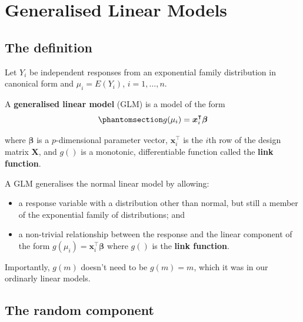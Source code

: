 \documentclass[
  a4paper,
  DIV=11,
  numbers=noendperiod]{scrreprt}
\newcommand{\term}[1]{\textbf{#1}}
\newenvironment{fbxSimple}[3]{\begin{tcolorbox}[enhanced, breakable,%
attach boxed title to top*={xshift=1.4pt},
boxed title style={boxrule=0.0mm, fuzzy shadow={1pt}{-1pt}{0mm}{0.1mm}{gray}, arc=.3em, rounded corners=east, sharp corners=west}, colframe=#1-color2, colbacktitle=#1-color1, colback = white, coltitle=black,  titlerule=0mm, toprule=0pt, bottomrule=.7pt, leftrule=.3em, rightrule=.7pt, outer arc=.3em,  	left=.5em, right=.5em, bottomtitle=1mm, toptitle=1mm,title=\textbf{#2}\hspace{0.5em}{#3}]}
{\end{tcolorbox}}
\begin{document}
\section{Generalised Linear Models}\label{generalised-linear-models}

\subsection{The definition}\label{the-definition}

\label{generalised-linear-models-1}
\begin{fbxSimple}{Definition}{Definition 4: }{Generalised Linear Models}
\label{generalised-linear-models-1}
Let \(Y_i\) be independent responses from an exponential family
distribution in canonical form and \(\mu_i=E(Y_i)\), \(i=1, \dots, n\).

A \term{generalised linear model} (GLM) is a model of the form
\begin{equation}\phantomsection\label{eq-glm-sys}{
g(\mu_i) = \boldsymbol{x}_i^{\intercal} \boldsymbol{\beta}
}\end{equation}

where \(\boldsymbol{\beta}\) is a \(p\)-dimensional parameter vector,
\(\boldsymbol{x}_i^{\intercal}\) is the \(i\)th row of the design matrix
\(\boldsymbol{X}\), and \(g()\) is a monotonic, differentiable function
called the \term{link function}.

\end{fbxSimple}

A GLM generalises the normal linear model by allowing:

\begin{itemize}
\item
  a response variable with a distribution other than normal, but still a
  member of the exponential family of distributions; and
\item
  a non-trivial relationship between the response and the linear
  component of the form
  \(g(\mu_i) = \boldsymbol{x}_i^{\intercal} \boldsymbol{\beta}\) where
  \(g()\) is the \term{link function}.
\end{itemize}

Importantly, \(g(m)\) doesn't need to be \(g(m)=m\), which it was in our
ordinarly linear models.

\subsection{\texorpdfstring{The \term{random
component}}{The random component}}\label{the-random-component}
\end{document}
